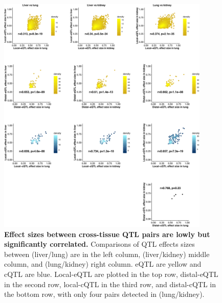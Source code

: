 \documentclass[10pt,letterpaper,twoside]{article}
\begin{document}
\begin{figure}[hp]
\renewcommand{\familydefault}{\sfdefault}\normalfont
\centering
\includegraphics[width=0.9\textwidth, trim={0in 0in 0in 0in}, clip]{figs/effect_size_by_effect_size.png}
\caption{\textbf{Effect sizes between cross-tissue QTL pairs are lowly but significantly correlated.} 
Comparisons of QTL effects sizes between (liver/lung) are in the left column, (liver/kidney) middle column, and (lung/kidney) right column. eQTL are yellow and cQTL are blue. Local-eQTL are plotted in the top row, distal-eQTL in the second row, local-cQTL in the third row, and distal-cQTL in the bottom row, with only four pairs detected in (lung/kidney). 
\label{fig:qtl_effect_size_comparison}}
\end{figure}

\clearpage
\end{document}
